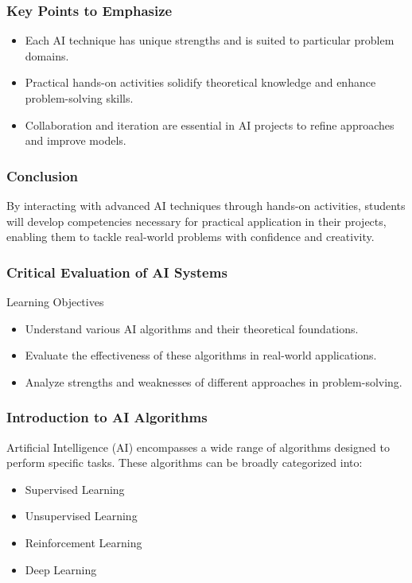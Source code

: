 \documentclass[aspectratio=169]{beamer}
\begin{document}
\begin{frame}
  \frametitle{Key Points to Emphasize}
  \begin{itemize}
    \item Each AI technique has unique strengths and is suited to particular problem domains.
    \item Practical hands-on activities solidify theoretical knowledge and enhance problem-solving skills.
    \item Collaboration and iteration are essential in AI projects to refine approaches and improve models.
  \end{itemize}
\end{frame}

\begin{frame}
  \frametitle{Conclusion}
  By interacting with advanced AI techniques through hands-on activities, students will develop competencies necessary for practical application in their projects, enabling them to tackle real-world problems with confidence and creativity.
\end{frame}

\begin{frame}[fragile]
    \frametitle{Critical Evaluation of AI Systems}
    
    \begin{block}{Learning Objectives}
        \begin{itemize}
            \item Understand various AI algorithms and their theoretical foundations.
            \item Evaluate the effectiveness of these algorithms in real-world applications.
            \item Analyze strengths and weaknesses of different approaches in problem-solving.
        \end{itemize}
    \end{block}
\end{frame}

\begin{frame}[fragile]
    \frametitle{Introduction to AI Algorithms}
    
    Artificial Intelligence (AI) encompasses a wide range of algorithms designed to perform specific tasks. These algorithms can be broadly categorized into:
    
    \begin{itemize}
        \item Supervised Learning
        \item Unsupervised Learning
        \item Reinforcement Learning
        \item Deep Learning
    \end{itemize}
\end{frame}
\end{document}
